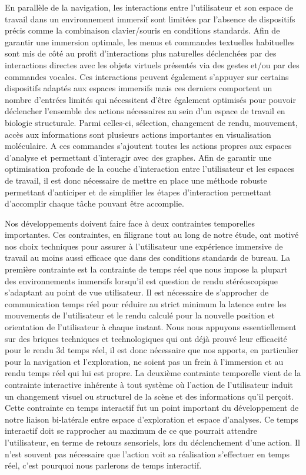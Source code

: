 En parallèle de la navigation, les interactions entre l'utilisateur et son espace de travail dans un environnement immersif sont limitées par l'absence de dispositifs précis comme la combinaison clavier/souris en conditions standards. Afin de garantir une immersion optimale, les menus et commandes textuelles habituelles sont mis de côté au profit d'interactions plus naturelles déclenchées par des interactions directes avec les objets virtuels présentés via des gestes et/ou par des commandes vocales. Ces interactions peuvent également s'appuyer sur certains dispositifs adaptés aux espaces immersifs mais ces derniers comportent un nombre d'entrées limités qui nécessitent d'être également optimisés pour pouvoir déclencher l'ensemble des actions nécessaires au sein d'un espace de travail en biologie structurale. Parmi celles-ci, sélection, changement de rendu, mouvement, accès aux informations sont plusieurs actions importantes en visualisation moléculaire. A ces commandes s'ajoutent toutes les actions propres aux espaces d'analyse et permettant d'interagir avec des graphes. Afin de garantir une optimisation profonde de la couche d'interaction entre l'utilisateur et les espaces de travail, il est donc nécessaire de mettre en place une méthode robuste permettant d'anticiper et de simplifier les étapes d'interaction permettant d'accomplir chaque tâche pouvant être accomplie. 

Nos développements doivent faire face à deux contraintes temporelles importantes. Ces contraintes, en filigrane tout au long de notre étude, ont motivé nos choix techniques pour assurer à l'utilisateur une expérience immersive de travail au moins aussi efficace que dans des conditions standards de bureau.
La première contrainte est la contrainte de temps réel que nous impose la plupart des environnements immersifs lorsqu'il est question de rendu stéréoscopique s'adaptant au point de vue utilisateur. Il est nécessaire de s'approcher de communication temps réel pour réduire au strict minimum la latence entre les mouvements de l'utilisateur et le rendu calculé pour la nouvelle position et orientation de l'utilisateur à chaque instant. Nous nous appuyons essentiellement sur des briques techniques et technologiques qui ont déjà prouvé leur efficacité pour le rendu 3d temps réel, il est donc nécessaire que nos apports, en particulier pour la navigation et l'exploration, ne soient pas un frein à l'immersion et au rendu temps réel qui lui est propre.
La deuxième contrainte temporelle vient de la contrainte interactive inhérente à tout système où l'action de l'utilisateur induit un changement visuel ou structurel de la scène et des informations qu'il perçoit. Cette contrainte en temps interactif fut un point important du développement de notre liaison bi-latérale entre espace d'exploration et espace d'analyses. Ce temps interactif doit se rapprocher au maximum de ce que pourrait attendre l'utilisateur, en terme de retours sensoriels, lors du déclenchement d'une action. Il n'est souvent pas nécessaire que l'action voit sa réalisation s'effectuer en temps réel, c'est pourquoi nous parlerons de temps interactif.

